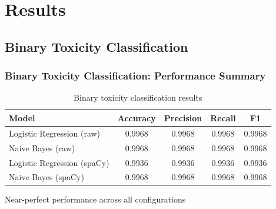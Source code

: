 \documentclass{beamer}
\begin{document}
\section{Results}

\subsection{Binary Toxicity Classification}

\begin{frame}
\frametitle{Binary Toxicity Classification: Performance Summary}

\begin{table}
\centering
\footnotesize
\begin{tabular}{lcccc}
\toprule
Model & Accuracy & Precision & Recall & F1 \\
\midrule
Logistic Regression (raw) & 0.9968 & 0.9968 & 0.9968 & 0.9968 \\
Naive Bayes (raw) & 0.9968 & 0.9968 & 0.9968 & 0.9968 \\
Logistic Regression (spaCy) & 0.9936 & 0.9936 & 0.9936 & 0.9936 \\
Naive Bayes (spaCy) & 0.9968 & 0.9968 & 0.9968 & 0.9968 \\
\bottomrule
\end{tabular}
\caption{Binary toxicity classification results}
\end{table}

\vspace{0.2cm}
\begin{center}
\colorbox{blue!10}{\parbox{0.7\linewidth}{\centering Near-perfect performance across all configurations}}
\end{center}

\end{frame}
\end{document}

